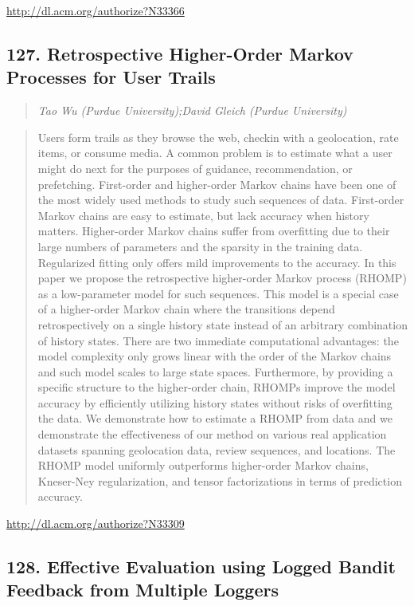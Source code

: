 \documentclass{article}
\begin{document}
\href{http://dl.acm.org/authorize?N33366}{http://dl.acm.org/authorize?N33366}

\subsection{127. Retrospective Higher-Order Markov Processes for User Trails}

\begin{quote}
\footnotesize{\textit{Tao Wu (Purdue University);David Gleich (Purdue University)}}

\end{quote}

\begin{quote}
Users form trails as they browse the web, checkin with a geolocation, rate items, or consume media. A common problem is to estimate what a user might do next for the purposes of guidance, recommendation, or prefetching. First-order and higher-order Markov chains have been one of the most widely used methods to study such sequences of data. First-order Markov chains are easy to estimate, but lack accuracy when history matters. Higher-order Markov chains suffer from overfitting due to their large numbers of parameters and the sparsity in the training data. Regularized fitting only offers mild improvements to the accuracy. In this paper we propose the retrospective higher-order Markov process (RHOMP) as a low-parameter model for such sequences. This model is a special case of a higher-order Markov chain where the transitions depend retrospectively on a single history state instead of an arbitrary combination of history states. There are two immediate computational advantages: the model complexity only grows linear with the order of the Markov chains and such model scales to large state spaces. Furthermore, by providing a specific structure to the higher-order chain, RHOMPs improve the model accuracy by efficiently utilizing history states without risks of overfitting the data. We demonstrate how to estimate a RHOMP from data and we demonstrate the effectiveness of our method on various real application datasets spanning geolocation data, review sequences, and locations. The RHOMP model uniformly outperforms higher-order Markov chains, Kneser-Ney regularization, and tensor factorizations in terms of prediction accuracy.
\end{quote}

\href{http://dl.acm.org/authorize?N33309}{http://dl.acm.org/authorize?N33309}

\subsection{128. Effective Evaluation using Logged Bandit Feedback from Multiple Loggers}
\end{document}
